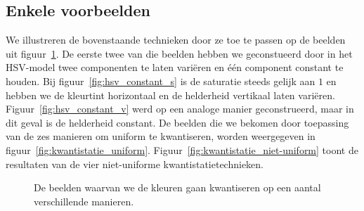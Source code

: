 \subsection{Enkele voorbeelden}

We illustreren de bovenstaande technieken door ze toe te passen op de beelden uit 
figuur~\ref{fig:kwantistatie_originelen}. De eerste twee van die beelden hebben we geconstueerd
door in het HSV-model twee componenten te laten vari\"eren en \'e\'en component constant te houden.
Bij figuur~\ref{fig:hsv_constant_s} is de saturatie steeds gelijk aan $1$ en hebben we de kleurtint 
horizontaal en de helderheid vertikaal laten vari\"eren. Figuur~\ref{fig:hsv_constant_v} werd 
op een analoge manier geconstrueerd, maar in dit geval is de helderheid constant.
De beelden die we bekomen door toepassing van de zes manieren om uniform te kwantiseren,
worden weergegeven in figuur~\ref{fig:kwantistatie_uniform}. Figuur~\ref{fig:kwantistatie_niet-uniform}
toont de resultaten van de vier niet-uniforme kwantistatietechnieken.

\begin{figure}[bp]
\vspace{10pt}
\centering
{}
\caption{\label{fig:kwantistatie_originelen}De beelden waarvan we de kleuren gaan kwantiseren 
op een aantal verschillende manieren.}
\end{figure}


